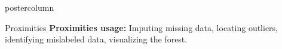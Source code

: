 \documentclass{beamer}
\begin{document}
\begin{frame}[fragile]{}
\begin{columns}
\begin{column}{.31\textwidth}
\begin{beamercolorbox}[center]{postercolumn}
\begin{minipage}{.98\textwidth}
{\begin{myblock}{Proximities}
\textbf{Proximities usage: }Imputing missing data, locating outliers, identifying mislabeled data, visualizing the forest.

\end{myblock}
}

  \end{minipage}
  \end{beamercolorbox}
  \end{column}
  
  
  
\end{columns}
\end{frame}
\end{document}
